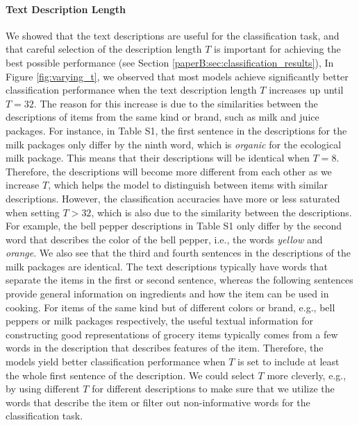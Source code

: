 \vspace{-3mm}
\paragraph{Text Description Length} We showed 
that the text descriptions are useful for the classification task, and that careful selection of the description length $T$ is important for achieving the best possible performance (see Section \ref{paperB:sec:classification_results}), %
In Figure \ref{fig:varying_t}, we observed that most models achieve significantly better classification performance when the text description length $T$ increases up until $T=32$. The reason for this increase is due to the similarities between the descriptions of items from the same kind or brand, such as milk and juice packages. 
For instance, in Table S1, the first sentence in the descriptions for the milk packages only differ by the ninth word, which is \textit{organic} for the ecological milk package. 
This means that their descriptions will be identical when $T=8$. Therefore, the descriptions will become more different from each other as we increase $T$, which helps the model to distinguish between items with similar descriptions. However, the classification accuracies have more or less saturated when setting $T > 32$, which is also due to the similarity between the descriptions. For example, the bell pepper descriptions in Table S1 only differ by the second word that describes the color of the bell pepper, i.e., the words \textit{yellow} and \textit{orange}. We also see that the third and fourth sentences in the descriptions of the milk packages are identical. The text descriptions typically have words that separate the items in the first or second sentence, whereas the following sentences provide general information on ingredients and how the item can be used in cooking. For items of the same kind but of different colors or brand, e.g., bell peppers or milk packages respectively, the useful textual information for constructing good representations of grocery items typically comes from a few words in the description that describes features of the item. Therefore, the models yield better classification performance when $T$ is set to include at least the whole first sentence of the description. We could select $T$ more cleverly, e.g., by using different $T$ for different descriptions to make sure that we utilize the words that describe the item or filter out non-informative words for the classification task. 

